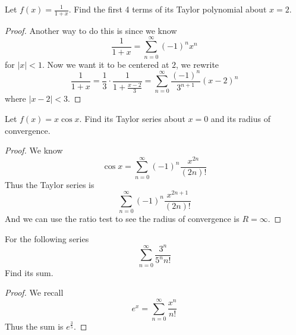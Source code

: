 \documentclass[openany]{book}
\begin{document}
\begin{prob}
    Let $f(x)=\frac{1}{1+x}$. Find the first 4 terms of its Taylor polynomial about $x=2$.
\end{prob}
\begin{proof}
    

    Another way to do this is since we know 
    \begin{equation*}
        \frac{1}{1+x}=\sum_{n=0}^\infty(-1)^nx^n
    \end{equation*}
    for $|x|<1$. Now we want it to be centered at $2$, we rewrite 
    \begin{equation*}
        \frac{1}{1+x}=\frac{1}{3}\cdot\frac{1}{1+\frac{x-2}{3}}=\sum_{n=0}^\infty\frac{(-1)^n}{3^{n+1}}(x-2)^n
    \end{equation*}
    where $|x-2|<3$.
\end{proof}




\begin{prob}
    Let $f(x)=x\cos x$. Find its Taylor series about $x=0$ and its radius of convergence.
\end{prob}
\begin{proof}
    We know 
    \begin{equation*}
        \cos x=\sum_{n=0}^\infty(-1)^n\frac{x^{2n}}{(2n)!}
    \end{equation*}
    Thus the Taylor series is
    \begin{equation*}
        \sum_{n=0}^\infty(-1)^n\frac{x^{2n+1}}{(2n)!}
    \end{equation*}
    And we can use the ratio test to see the radius of convergence is $R=\infty$.
\end{proof}



\begin{prob}
    For the following series 
    \begin{equation*}
        \sum_{n=0}^\infty\frac{3^n}{5^nn!}
    \end{equation*}
    Find its sum.
\end{prob}
\begin{proof}
    We recall 
    \begin{equation*}
        e^x=\sum_{n=0}^\infty\frac{x^n}{n!}
    \end{equation*}
    Thus the sum is $e^\frac{3}{5}$.
\end{proof}
\end{document}
